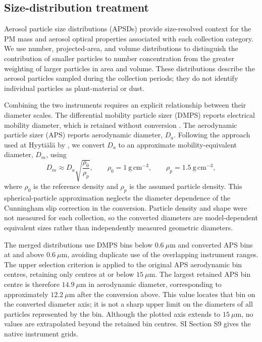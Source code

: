 \subsection{Size-distribution treatment}
\label{sec:size}

Aerosol particle size distributions (APSDs) provide size-resolved
context for the PM mass and aerosol optical properties associated
with each collection category. We use number, projected-area, and
volume distributions to distinguish the contribution of smaller
particles to number concentration from the greater weighting of
larger particles in area and volume. These distributions describe
the aerosol particles sampled during the collection periods;
they do not identify individual particles as plant-material or dust.

Combining the two instruments requires an explicit relationship
between their diameter scales. The differential mobility particle
sizer (DMPS) reports electrical mobility diameter, which is retained
without conversion \citep{wiedensohler2012}. The aerodynamic particle
sizer (APS) reports aerodynamic diameter, \(D_a\). Following the
approach used at Hyyti\"al\"a by \citet{ylivinkka2025}, we convert
\(D_a\) to an approximate mobility-equivalent diameter, \(D_m\), using
\begin{equation}
D_m \approx D_a\sqrt{\frac{\rho_0}{\rho_p}},
\qquad
\rho_0 = 1~\mathrm{g\,cm^{-3}},
\qquad
\rho_p = 1.5~\mathrm{g\,cm^{-3}},
\end{equation}
where \(\rho_0\) is the reference density and \(\rho_p\) is the assumed
particle density. This spherical-particle approximation neglects
the diameter dependence of the Cunningham slip correction in the
conversion. Particle density and shape were not measured for each
collection, so the converted diameters are model-dependent
equivalent sizes rather than independently measured geometric
diameters.

The merged distributions use DMPS bins below
\(0.6~\mu\mathrm{m}\) and converted APS bins at and above
\(0.6~\mu\mathrm{m}\), avoiding duplicate use of the overlapping
instrument ranges. The upper selection criterion is applied to
the original APS aerodynamic bin centres, retaining only centres
at or below \(15~\mu\mathrm{m}\). The largest retained APS bin
centre is therefore \(14.9~\mu\mathrm{m}\) in aerodynamic diameter,
corresponding to approximately \(12.2~\mu\mathrm{m}\) after the
conversion above. This value locates that bin on the converted
diameter axis; it is not a sharp upper limit on the diameters of
all particles represented by the bin. Although the plotted axis
extends to \(15~\mu\mathrm{m}\), no values are extrapolated beyond
the retained bin centres. SI Section S9 gives the native
instrument grids.

